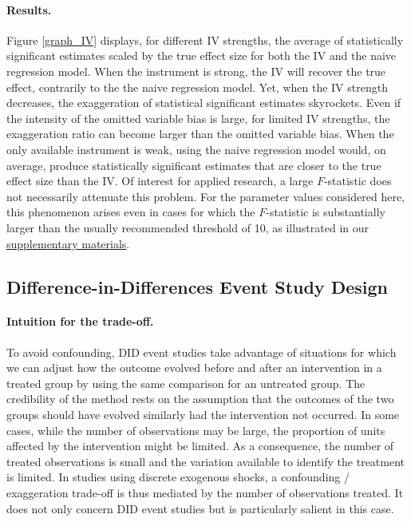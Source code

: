\documentclass[12pt]{article}
\begin{document}
		\paragraph{Results.} Figure \ref{graph_IV} displays, for different IV strengths, the average of statistically significant estimates scaled by the true effect size for both the IV and the naive regression model. When the instrument is strong, the IV will recover the true effect, contrarily to the the naive regression model. Yet, when the IV strength decreases, the exaggeration of statistical significant estimates skyrockets. Even if the intensity of the omitted variable bias is large, for limited IV strengths, the exaggeration ratio can become larger than the omitted variable bias. When the only available instrument is weak, using the naive regression model would, on average, produce statistically significant estimates that are closer to the true effect size than the IV. Of interest for applied research, a large $F$-statistic does not necessarily attenuate this problem. For the parameter values considered here, this phenomenon arises even in cases for which the $F$-statistic is substantially larger than the usually recommended threshold of 10, as illustrated in our \href{https://vincentbagilet.github.io/causal_inflation/IV.html#f-statistic-analysis}{supplementary materials}. 
		
		
	\subsection{Difference-in-Differences Event Study Design}\label{sim_DID}
    
        \paragraph{Intuition for the trade-off.} To avoid confounding, DID event studies take advantage of situations for which we can adjust how the outcome evolved before and after an intervention in a treated group by using the same comparison for an untreated group. The credibility of the method rests on the assumption that the outcomes of the two groups should have evolved similarly had the intervention not occurred. In some cases,  while the number of observations may be large, the proportion of units affected by the intervention might be limited. As a consequence, the number of treated observations is small and the variation available to identify the treatment is limited. In studies using discrete exogenous shocks, a confounding / exaggeration trade-off is thus mediated by the number of observations treated. It does not only concern DID event studies but is particularly salient in this case. 
        
\end{document}
